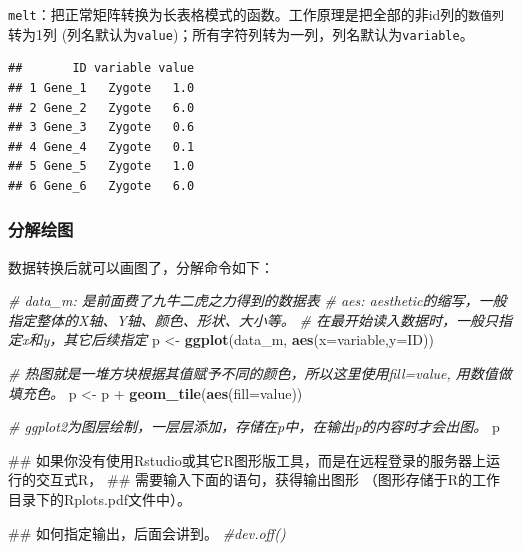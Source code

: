\documentclass[]{article}
\newenvironment{Shaded}{\begin{snugshade}}{\end{snugshade}}
\newcommand{\KeywordTok}[1]{\textcolor[rgb]{0.13,0.29,0.53}{\textbf{{#1}}}}
\newcommand{\DataTypeTok}[1]{\textcolor[rgb]{0.13,0.29,0.53}{{#1}}}
\newcommand{\StringTok}[1]{\textcolor[rgb]{0.31,0.60,0.02}{{#1}}}
\newcommand{\CommentTok}[1]{\textcolor[rgb]{0.56,0.35,0.01}{\textit{{#1}}}}
\newcommand{\NormalTok}[1]{{#1}}
\numberwithin{figure}{section}
\numberwithin{table}{section}
\theoremstyle{definition}
\theoremstyle{definition}
\theoremstyle{definition}
\theoremstyle{remark}
\begin{document}
\texttt{melt}：把正常矩阵转换为长表格模式的函数。工作原理是把全部的非id列的\texttt{数值列}转为1列
(列名默认为\texttt{value})；所有字符列转为一列，列名默认为\texttt{variable}。

\begin{Shaded}
\end{Shaded}

\begin{verbatim}
##       ID variable value
## 1 Gene_1   Zygote   1.0
## 2 Gene_2   Zygote   6.0
## 3 Gene_3   Zygote   0.6
## 4 Gene_4   Zygote   0.1
## 5 Gene_5   Zygote   1.0
## 6 Gene_6   Zygote   6.0
\end{verbatim}

\subsubsection{分解绘图}

数据转换后就可以画图了，分解命令如下：

\begin{Shaded}
\begin{Highlighting}[]
\CommentTok{# data_m: 是前面费了九牛二虎之力得到的数据表}
\CommentTok{# aes: aesthetic的缩写，一般指定整体的X轴、Y轴、颜色、形状、大小等。}
\CommentTok{#      在最开始读入数据时，一般只指定x和y，其它后续指定}
\NormalTok{p <-}\StringTok{ }\KeywordTok{ggplot}\NormalTok{(data_m, }\KeywordTok{aes}\NormalTok{(}\DataTypeTok{x=}\NormalTok{variable,}\DataTypeTok{y=}\NormalTok{ID)) }

\CommentTok{# 热图就是一堆方块根据其值赋予不同的颜色，所以这里使用fill=value, 用数值做填充色。}
\NormalTok{p <-}\StringTok{ }\NormalTok{p +}\StringTok{ }\KeywordTok{geom_tile}\NormalTok{(}\KeywordTok{aes}\NormalTok{(}\DataTypeTok{fill=}\NormalTok{value)) }

\CommentTok{# ggplot2为图层绘制，一层层添加，存储在p中，在输出p的内容时才会出图。}
\NormalTok{p}

\NormalTok{## 如果你没有使用Rstudio或其它R图形版工具，而是在远程登录的服务器上运行的交互式R，}
\NormalTok{## 需要输入下面的语句，获得输出图形 （图形存储于R的工作目录下的Rplots.pdf文件中）。}

\NormalTok{## 如何指定输出，后面会讲到。}
\CommentTok{#dev.off()}
\end{Highlighting}
\end{Shaded}
\end{document}
